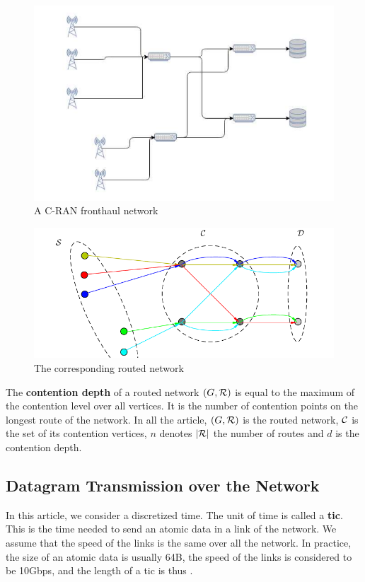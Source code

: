 \documentclass[english]{article}
\begin{document}
	\begin{figure}[h]
	\centering
	\includegraphics[scale=0.5]{fronthaul}
\caption{A C-RAN fronthaul network}
\label{fig:fronthaul}
\end{figure}
	\begin{figure}[h]
	\centering
	\includegraphics[scale=0.5]{graphmodel}
\caption{The corresponding routed network }
\label{fig:graph}
\end{figure}
	The  \textbf{contention depth} of a routed network $(G,{\cal R})$ is equal to the maximum of the contention level over all vertices. It is the number of contention points on the longest route of the network. In all the article, $(G,{\cal R})$ is the routed network, ${\cal C}$ is the set of its contention vertices, $n$ denotes $|\cal{R}|$ the number of routes and $d$ is the contention depth.  


 \subsection{Datagram Transmission over the Network}
	    
 		In this article, we consider a discretized time. The unit of time is called a {\bf tic}. This is the time needed to send an atomic data in a link of the network. We assume that the speed of the links is the same over all the network. In practice, the size of an atomic data is usually 64B, the speed of the links is considered to be 10Gbps, and the length of a tic is thus  .
\end{document}
